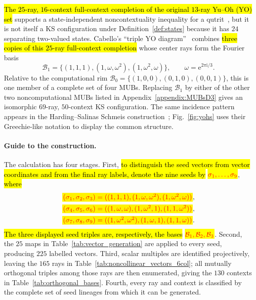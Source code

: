 \documentclass[%
  reprint,
  superscriptaddress,
  showpacs,
  showkeys,
  amsmath,amssymb,
  pra,
  longbibliography,
  floatfix,
  x11names
]{revtex4-2}
\newcommand{\ii}{\mathrm{i}}
\newenvironment{revision}{\begingroup}{\endgroup}
\newcommand{\corr}[1]{{\color{red}\hl{#1}}}
\newcommand{\corrmath}[1]{\begingroup\setlength{\fboxsep}{1pt}\colorbox{yellow}{\ensuremath{\color{red}#1}}\endgroup}
\begin{document}
\begin{revision}
\corr{The $25$-ray, $16$-context full-context completion of the original $13$-ray Yu--Oh (YO) set} supports a state-independent noncontextuality inequality for a qutrit~\cite{PhysRevLett.103.050401,Yu-2012,Yu2015}, but it is not itself a KS configuration under Definition~\ref{def:states} because it has $24$ separating two-valued states.  Cabello's ``triple YO diagram''~\cite{Cabello2025} combines \corr{three copies of this $25$-ray full-context completion} whose center rays form the Fourier basis
\[
\mathcal{B}_1=\{(1,1,1),(1,\omega,\omega^2),(1,\omega^2,\omega)\},
\qquad \omega=\mathrm{e}^{2\pi\ii{}/3}.
\]
Relative to the computational rim $\mathcal{B}_0=\{(1,0,0),(0,1,0),(0,0,1)\}$, this is one member of a complete set of four MUBs.  Replacing $\mathcal{B}_1$ by either of the other two noncomputational MUBs listed in Appendix~\ref{appendix:MUBsD3} gives an isomorphic $69$-ray, $50$-context KS configuration.  The same incidence pattern appears in the Harding--Salinas Schmeis construction~\cite[Fig.~2 and Theorem~2.6]{harding2025remarksIJTP}; Fig.~\ref{fig:yohs} uses their Greechie-like notation to display the common structure.

\paragraph*{Guide to the construction.}
The calculation has four stages.  First, \corr{to distinguish the seed vectors from
vector coordinates and from the final ray labels, denote the nine seeds by}
\corrmath{\sigma_1,\ldots,\sigma_9}, \corr{where}
\[
\begin{aligned}
&\corrmath{(\sigma_1,\sigma_2,\sigma_3)=((1,1,1),(1,\omega,\omega^2),(1,\omega^2,\omega))},\\
&\corrmath{(\sigma_4,\sigma_5,\sigma_6)=((1,\omega,\omega),(1,\omega^2,1),(1,1,\omega^2))},\\
&\corrmath{(\sigma_7,\sigma_8,\sigma_9)=((1,\omega^2,\omega^2),(1,\omega,1),(1,1,\omega))}.
\end{aligned}
\]
\corr{The three displayed seed triples are, respectively, the bases}
\corrmath{\mathcal{B}_1,\mathcal{B}_2,\mathcal{B}_3}.
Second, the $25$ maps in Table~\ref{tab:vector_generation} are applied to every seed, producing $225$ labelled vectors.  Third, scalar multiples are identified projectively, leaving the $165$ rays in Table~\ref{tab:noncollinear_vectors_6col}; all mutually orthogonal triples among those rays are then enumerated, giving the $130$ contexts in Table~\ref{tab:orthogonal_bases}.  Fourth, every ray and context is classified by the complete set of seed lineages from which it can be generated.


\end{revision}
\end{document}

